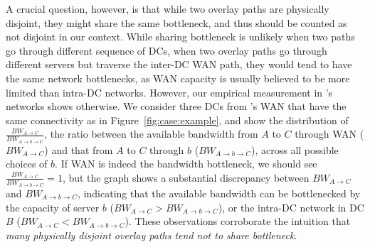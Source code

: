 A crucial question, however, is that while two overlay paths are
physically disjoint, they might share the same bottleneck, and
thus should be counted as not disjoint in our context.
While sharing bottleneck is unlikely when two paths go through 
different sequence of DCs, 
when two overlay paths go through different servers but traverse
the inter-DC WAN path, they would tend to have the same network
bottlenecks, as WAN capacity is usually believed to be more
limited than intra-DC networks.
However, our empirical measurement in \company's networks shows
otherwise.
We consider three DCs from \company's WAN that have the same
connectivity as in Figure~\ref{fig:case:example},
and show the distribution of
$\frac{BW_{A\rightarrow C}}{BW_{A\rightarrow b\rightarrow C}}$,
the ratio between the available bandwidth
from $A$ to $C$ through WAN ($BW_{A\rightarrow C}$) and
that from $A$ to $C$ through $b$
($BW_{A\rightarrow b\rightarrow C}$),
across all possible choices of $b$.
If WAN is indeed the bandwidth bottleneck, we should see
$\frac{BW_{A\rightarrow C}}{BW_{A\rightarrow b\rightarrow C}}=1$,
but the graph shows a substantial discrepancy between
$BW_{A\rightarrow C}$ and $BW_{A\rightarrow b\rightarrow C}$,
indicating that the available bandwidth can be bottlenecked by
the capacity of server $b$
($BW_{A\rightarrow C}>BW_{A\rightarrow b\rightarrow C}$),
or the intra-DC network in DC $B$
($BW_{A\rightarrow C}<BW_{A\rightarrow b\rightarrow C}$).
These observations corroborate the intuition that
{\em many physically
disjoint overlay paths tend not to share bottleneck}.



